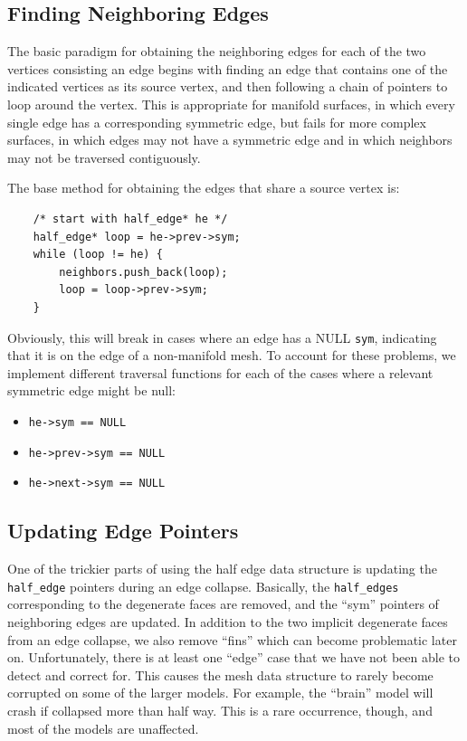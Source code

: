 \documentclass[11pt]{article}
\begin{document}
\subsection{Finding Neighboring Edges}

The basic paradigm for obtaining the neighboring edges for each of the two
vertices consisting an edge begins with finding an edge that contains one of
the indicated vertices as its source vertex, and then following a chain of
pointers to loop around the vertex. This is appropriate for manifold surfaces,
in which every single edge has a corresponding symmetric edge, but fails for
more complex surfaces, in which edges may not have a symmetric edge and in
which neighbors may not be traversed contiguously.

The base method for obtaining the edges that share a source vertex is:

\begin{verbatim}
    /* start with half_edge* he */
    half_edge* loop = he->prev->sym;
    while (loop != he) {
        neighbors.push_back(loop);
        loop = loop->prev->sym;
    }
\end{verbatim}

Obviously, this will break in cases where an edge has a NULL \verb`sym`,
indicating that it is on the edge of a non-manifold mesh. To account for these
problems, we implement different traversal functions for each of the cases where a
relevant symmetric edge might be null:

\begin{itemize}
    \item \verb`he->sym == NULL`
    \item \verb`he->prev->sym == NULL`
    \item \verb`he->next->sym == NULL`
\end{itemize}

\subsection{Updating Edge Pointers}

One of the trickier parts of using the half edge data structure is updating the
\verb`half_edge` pointers during an edge collapse. Basically, the
\verb`half_edges` corresponding to the degenerate faces are removed, and the
``sym'' pointers of neighboring edges are updated. In addition to the two
implicit degenerate faces from an edge collapse, we also remove ``fins'' which
can become problematic later on. Unfortunately, there is at least one ``edge''
case that we have not been able to detect and correct for. This causes the mesh
data structure to rarely become corrupted on some of the larger models. For
example, the ``brain'' model will crash if collapsed more than half way. This
is a rare occurrence, though, and most of the models are unaffected.
\end{document}
